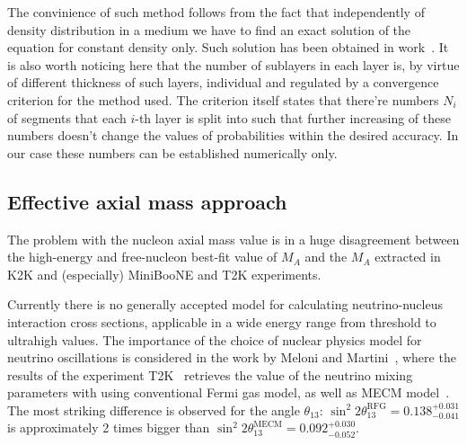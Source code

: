 The convinience of such method follows from the fact that independently of density distribution in a medium we have to find an exact solution of the equation for constant density only. Such solution has been obtained in work~\cite{Naumov:1991ju,Naumov:1991rh}. It is also worth noticing here that the number of sublayers in each layer is, by virtue of different thickness of such layers, individual and regulated by a convergence criterion for the method used. The criterion itself states that there're numbers ${N_{i}}$ of segments that each $i$-th layer is split into such that further increasing of these numbers doesn't change the values of probabilities within the desired accuracy. In our case these numbers can be established numerically only.

\subsection{Effective axial mass approach}
The problem with the nucleon axial mass value is in a huge disagreement between the high-energy and free-nucleon best-fit value of $M_A$ and the $M_A$ extracted in K2K and (especially) MiniBooNE and T2K experiments.

Currently there is no generally accepted model for calculating neutrino-nucleus interaction cross sections, applicable in a wide energy range from threshold to ultrahigh values. The importance of the choice of nuclear physics model for neutrino oscillations is considered in the work by Meloni and Martini~\cite{Meloni:2012fq}, where the results of the experiment T2K~\cite{Abe:2011sj,Abe:2012gx} retrieves the value of the neutrino mixing parameters with using conventional Fermi gas model, as well as MECM model~\cite{Martini:2009uj}. The most striking difference is observed for the angle $\theta_{13}$: $\sin^{2}2\theta_{13}^{\textrm{RFG}}=0.138^{+0.031}_{-0.041}$ is approximately 2 times bigger than $\sin^{2}2\theta_{13}^{\textrm{MECM}}=0.092^{+0.030}_{-0.052}$.







































